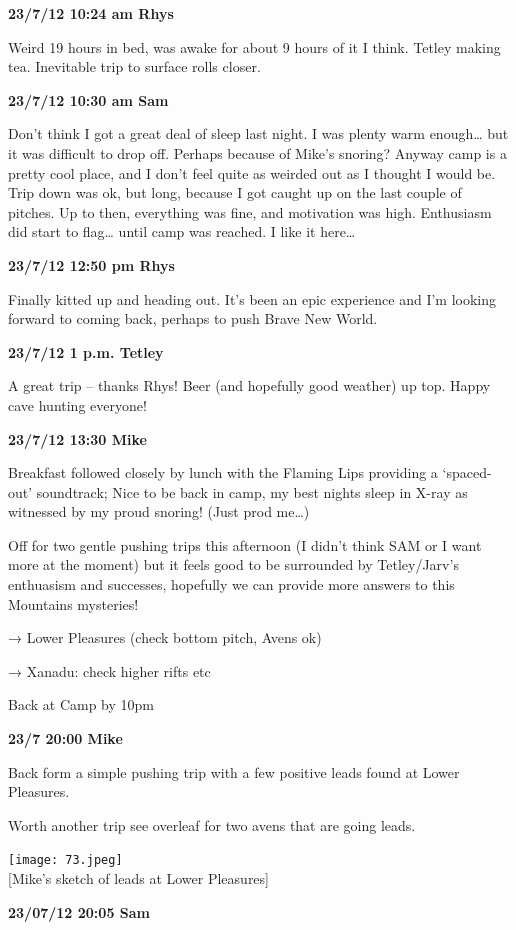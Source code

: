 \textbf{23/7/12 10:24 am Rhys}

Weird 19 hours in bed, was awake for about 9 hours of it I think. Tetley
making tea. Inevitable trip to surface rolls closer.

\textbf{23/7/12 10:30 am Sam}

Don't think I got a great deal of sleep last night. I was plenty warm
enough\ldots{} but it was difficult to drop off. Perhaps because of
Mike's snoring? Anyway camp is a pretty cool place, and I don't feel
quite as weirded out as I thought I would be. Trip down was ok, but
long, because I got caught up on the last couple of pitches. Up to then,
everything was fine, and motivation was high. Enthusiasm did start to
flag\ldots{} until camp was reached. I like it here\ldots{}

\textbf{23/7/12 12:50 pm Rhys}

Finally kitted up and heading out. It's been an epic experience and I'm
looking forward to coming back, perhaps to push Brave New World.

\textbf{23/7/12 1 p.m. Tetley}

A great trip -- thanks Rhys! Beer (and hopefully good weather) up top.
Happy cave hunting everyone!

\textbf{23/7/12 13:30 Mike}

Breakfast followed closely by lunch with the Flaming Lips providing a
`spaced-out' soundtrack; Nice to be back in camp, my best nights sleep
in X-ray as witnessed by my proud snoring! (Just prod me\ldots{})

Off for two gentle pushing trips this afternoon (I didn't think SAM or I
want more at the moment) but it feels good to be surrounded by
Tetley/Jarv's enthuasism and successes, hopefully we can provide more
answers to this Mountains mysteries!

→ Lower Pleasures (check bottom pitch, Avens ok)

→ Xanadu: check higher rifts etc

Back at Camp by 10pm

\textbf{23/7 20:00 Mike}

Back form a simple pushing trip with a few positive leads found at Lower
Pleasures.

Worth another trip see overleaf for two avens that are going leads.

\texttt{[image: 73.jpeg]}\\
{[}Mike's sketch of leads at Lower Pleasures{]}

\textbf{23/07/12 20:05 Sam}

